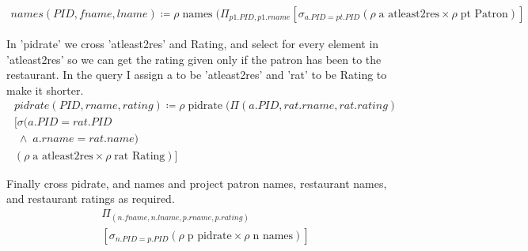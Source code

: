 \documentclass{article}
\begin{document}
\begin{enumerate}
		\begin{align}
         names(PID,fname,lname) \coloneqq \rho \; \text{names} \;(\Pi_{p1.PID, p1.rname} [\sigma_{a.PID = pt.PID} (\rho \; \text{a atleast2res} \times \rho \; \text{pt Patron})]          
		\end{align}
		
		In 'pidrate' we cross 'atleast2res' and Rating, and select for every element in 'atleast2res' so we can get the rating given only if the patron has been to the restaurant. In the query I assign a to be 'atleast2res' and 'rat' to be Rating to make it shorter.
		\begin{align}
          pidrate(PID,rname,rating)\coloneqq \rho \; \text{pidrate} \;(\Pi(a.PID, rat.rname, rat.rating)\\	[\sigma(a.PID = rat.PID \\ \; \wedge \; a.rname = rat.name) \\ (\rho \; \text{a atleast2res} \times \rho \; \text{rat Rating})]          
		\end{align}
		
		Finally cross pidrate, and names and project patron names, restaurant names, and restaurant ratings  as required.
		\begin{align}
               \Pi_{(n.fname, n.lname, p.rname, p.rating)} \\ [\sigma_{n.PID = p.PID} (\rho \; \text{p pidrate} \times \rho \; \text{n names})]  
		\end{align}

\end{enumerate}
\end{document}
